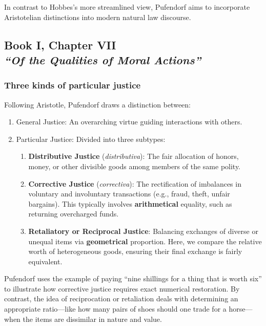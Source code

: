     In contrast to Hobbes’s more streamlined view, Pufendorf aims to incorporate Aristotelian distinctions into modern natural law discourse.

    \subsection[Of the Qualities of Moral Actions cont'd]{Book I, Chapter VII\\
                \textit{“Of the Qualities of Moral Actions”}}

        \subsubsection{Three kinds of particular justice}

            Following Aristotle, Pufendorf draws a distinction between:

            \begin{enumerate}
                \item General Justice: An overarching virtue guiding interactions with others.
                \item Particular Justice: Divided into three subtypes:
                    \begin{enumerate}
                        \item \textbf{Distributive Justice} (\textit{distributiva}): The fair allocation of honors, money, or other divisible goods among members of the same polity.
                        
                        \item \textbf{Corrective Justice} (\textit{correctiva}): The rectification of imbalances in voluntary and involuntary transactions (e.g., fraud, theft, unfair bargains). This typically involves \textbf{arithmetical} equality, such as returning overcharged funds.
                        
                        \item \textbf{Retaliatory or Reciprocal Justice}: Balancing exchanges of diverse or unequal items via \textbf{geometrical} proportion. Here, we compare the relative worth of heterogeneous goods, ensuring their final exchange is fairly equivalent.
                    \end{enumerate}
            \end{enumerate}

            Pufendorf uses the example of paying “nine shillings for a thing that is worth six” to illustrate how corrective justice requires exact numerical restoration. By contrast, the idea of reciprocation or retaliation deals with determining an appropriate ratio—like how many pairs of shoes should one trade for a horse—when the items are dissimilar in nature and value.

